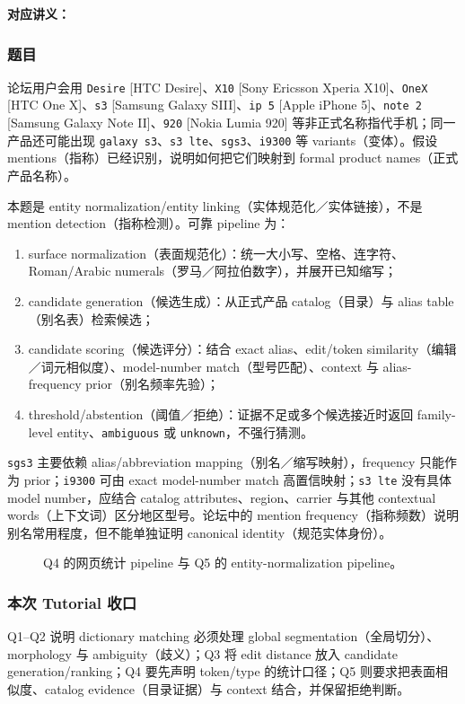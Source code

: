 
\textbf{对应讲义：}

\subsubsection*{题目}

论坛用户会用 \texttt{Desire} [HTC Desire]、\texttt{X10} [Sony Ericsson Xperia X10]、\texttt{OneX} [HTC One X]、\texttt{s3} [Samsung Galaxy SIII]、\texttt{ip 5} [Apple iPhone 5]、\texttt{note 2} [Samsung Galaxy Note II]、\texttt{920} [Nokia Lumia 920] 等非正式名称指代手机；同一产品还可能出现 \texttt{galaxy s3}、\texttt{s3 lte}、\texttt{sgs3}、\texttt{i9300} 等 variants（变体）。假设 mentions（指称）已经识别，说明如何把它们映射到 formal product names（正式产品名称）。

\begin{checkedsolution}
本题是 entity normalization/entity linking（实体规范化／实体链接），不是 mention detection（指称检测）。可靠 pipeline 为：
\begin{enumerate}
  \item surface normalization（表面规范化）：统一大小写、空格、连字符、Roman/Arabic numerals（罗马／阿拉伯数字），并展开已知缩写；
  \item candidate generation（候选生成）：从正式产品 catalog（目录）与 alias table（别名表）检索候选；
  \item candidate scoring（候选评分）：结合 exact alias、edit/token similarity（编辑／词元相似度）、model-number match（型号匹配）、context 与 alias-frequency prior（别名频率先验）；
  \item threshold/abstention（阈值／拒绝）：证据不足或多个候选接近时返回 family-level entity、\texttt{ambiguous} 或 \texttt{unknown}，不强行猜测。
\end{enumerate}

\texttt{sgs3} 主要依赖 alias/abbreviation mapping（别名／缩写映射），frequency 只能作为 prior；\texttt{i9300} 可由 exact model-number match 高置信映射；\texttt{s3 lte} 没有具体 model number，应结合 catalog attributes、region、carrier 与其他 contextual words（上下文词）区分地区型号。论坛中的 mention frequency（指称频数）说明别名常用程度，但不能单独证明 canonical identity（规范实体身份）。
\end{checkedsolution}

\begin{figure}[htbp]
  \centering
  \resizebox{\textwidth}{!}{}
  \caption{Q4 的网页统计 pipeline 与 Q5 的 entity-normalization pipeline。}
  \label{fig:sc4002-tut02-pipelines}
\end{figure}

\subsubsection*{本次 Tutorial 收口}

Q1--Q2 说明 dictionary matching 必须处理 global segmentation（全局切分）、morphology 与 ambiguity（歧义）；Q3 将 edit distance 放入 candidate generation/ranking；Q4 要先声明 token/type 的统计口径；Q5 则要求把表面相似度、catalog evidence（目录证据）与 context 结合，并保留拒绝判断。
